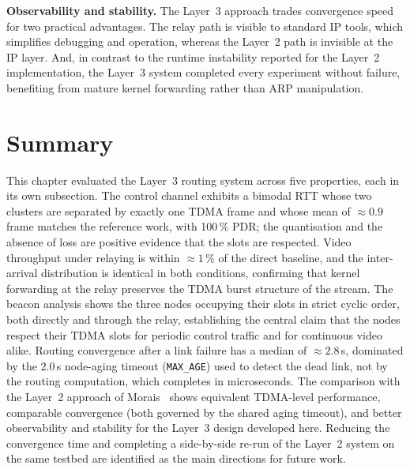 \textbf{Observability and stability.} The Layer~3 approach trades convergence
speed for two practical advantages. The relay path is visible to standard IP
tools, which simplifies debugging and operation, whereas the Layer~2 path is
invisible at the IP layer. And, in contrast to the runtime instability
reported for the Layer~2 implementation, the Layer~3 system completed every
experiment without failure, benefiting from mature kernel forwarding rather
than ARP manipulation.


\section{Summary}
\label{sec:eval-summary}

This chapter evaluated the Layer~3 routing system across five properties, each
in its own subsection. The control channel exhibits a bimodal RTT whose two
clusters are separated by exactly one TDMA frame and whose mean of
$\approx 0.9$ frame matches the reference work, with 100\,\% PDR; the
quantisation and the absence of loss are positive evidence that the slots are
respected. Video throughput under relaying is within $\approx 1\,\%$ of the
direct baseline, and the inter-arrival distribution is identical in both
conditions, confirming that kernel forwarding at the relay preserves the TDMA
burst structure of the stream. The beacon analysis shows the three nodes
occupying their slots in strict cyclic order, both directly and through the
relay, establishing the central claim that the nodes respect their TDMA slots
for periodic control traffic and for continuous video alike. Routing
convergence after a link failure has a median of $\approx 2.8$\,s, dominated by
the $2.0$\,s node-aging timeout (\texttt{MAX\_AGE}) used to detect the dead
link, not by the routing computation, which completes in microseconds. The
comparison with the Layer~2 approach of Morais~\cite{morais2024synchronization}
shows equivalent TDMA-level performance, comparable convergence (both governed
by the shared aging timeout), and better observability and stability for the
Layer~3 design developed here. Reducing the convergence time and completing a
side-by-side re-run of the Layer~2 system on the same testbed are identified
as the main directions for future work.
